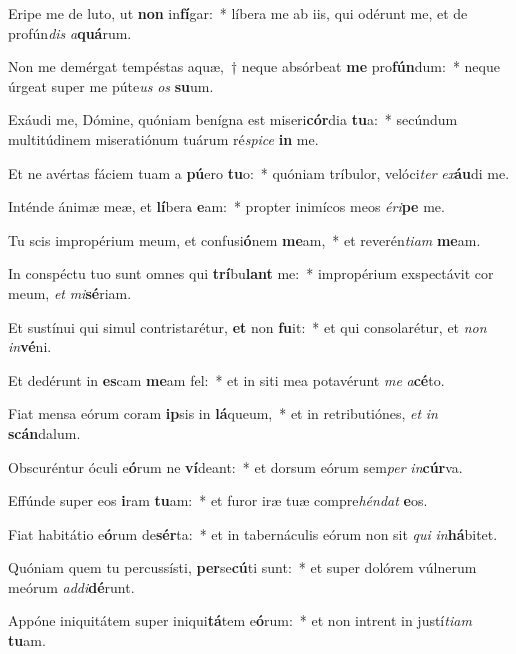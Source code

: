\item Eripe me de luto, ut \textbf{non} in\textbf{fí}gar:~* líbera me ab iis, qui odérunt me, et de profún\textit{dis} \textit{a}\textbf{quá}rum.
\item Non me demérgat tempéstas aquæ,~† neque absórbeat \textbf{me} pro\textbf{fún}dum:~* neque úrgeat super me púte\textit{us} \textit{os} \textbf{su}um.
\item Exáudi me, Dómine, quóniam benígna est miseri\textbf{cór}dia \textbf{tu}a:~* secúndum multitúdinem miseratiónum tuárum ré\textit{spi}\textit{ce} \textbf{in} me.
\item Et ne avértas fáciem tuam a \textbf{pú}ero \textbf{tu}o:~* quóniam tríbulor, velóci\textit{ter} \textit{ex}\textbf{áu}di me.
\item Inténde ánimæ meæ, et \textbf{lí}bera \textbf{e}am:~* propter inimícos meos \textit{é}\textit{ri}\textbf{pe} me.
\item Tu scis impropérium meum, et confusi\textbf{ó}nem \textbf{me}am,~* et reverén\textit{ti}\textit{am} \textbf{me}am.
\item In conspéctu tuo sunt omnes qui \textbf{trí}bu\textbf{lant} me:~* impropérium exspectávit cor meum, \textit{et} \textit{mi}\textbf{sé}riam.
\item Et sustínui qui simul contristarétur, \textbf{et} non \textbf{fu}it:~* et qui consolarétur, et \textit{non} \textit{in}\textbf{vé}ni.
\item Et dedérunt in \textbf{es}cam \textbf{me}am fel:~* et in siti mea potavérunt \textit{me} \textit{a}\textbf{cé}to.
\item Fiat mensa eórum coram \textbf{ip}sis in \textbf{lá}queum,~* et in retributiónes, \textit{et} \textit{in} \textbf{scán}dalum.
\item Obscuréntur óculi e\textbf{ó}rum ne \textbf{ví}deant:~* et dorsum eórum sem\textit{per} \textit{in}\textbf{cúr}va.
\item Effúnde super eos \textbf{i}ram \textbf{tu}am:~* et furor iræ tuæ compre\textit{hén}\textit{dat} \textbf{e}os.
\item Fiat habitátio e\textbf{ó}rum de\textbf{sér}ta:~* et in tabernáculis eórum non sit \textit{qui} \textit{in}\textbf{há}bitet.
\item Quóniam quem tu percussísti, \textbf{per}se\textbf{cú}ti sunt:~* et super dolórem vúlnerum meórum \textit{ad}\textit{di}\textbf{dé}runt.
\item Appóne iniquitátem super iniqui\textbf{tá}tem e\textbf{ó}rum:~* et non intrent in justí\textit{ti}\textit{am} \textbf{tu}am.
